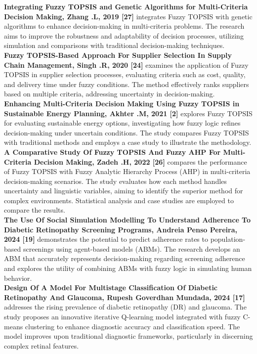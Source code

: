 \documentclass[12pt,a4paper]{article}
\begin{document}
\textbf{Integrating Fuzzy TOPSIS and Genetic Algorithms for Multi-Criteria Decision Making, Zhang .L, 2019 [27] }integrates Fuzzy TOPSIS with genetic algorithms to enhance decision-making in multi-criteria problems. The research aims to improve the robustness and adaptability of decision processes, utilizing simulation and comparisons with traditional decision-making techniques.\\
\newpage
\textbf{Fuzzy TOPSIS-Based Approach For Supplier Selection In Supply Chain Management, Singh .R, 2020 [24]} examines the application of Fuzzy TOPSIS in supplier selection processes, evaluating criteria such as cost, quality, and delivery time under fuzzy conditions. The method effectively ranks suppliers based on multiple criteria, addressing uncertainty in decision-making.\\

\textbf{Enhancing Multi-Criteria Decision Making Using Fuzzy TOPSIS in Sustainable Energy Planning, Akhter .M, 2021 [2]} explores Fuzzy TOPSIS for evaluating sustainable energy options, investigating how fuzzy logic refines decision-making under uncertain conditions. The study compares Fuzzy TOPSIS with traditional methods and employs a case study to illustrate the methodology.\\

\textbf{A Comparative Study Of Fuzzy TOPSIS And Fuzzy AHP For Multi-Criteria Decision Making, Zadeh .H, 2022 [26]} compares the performance of Fuzzy TOPSIS with Fuzzy Analytic Hierarchy Process (AHP) in multi-criteria decision-making scenarios. The study evaluates how each method handles uncertainty and linguistic variables, aiming to identify the superior method for complex environments. Statistical analysis and case studies are employed to compare the results.\\

\textbf{The Use Of Social Simulation Modelling To Understand Adherence To Diabetic Retinopathy Screening Programs, Andreia Penso Pereira, 2024 [19]} demonstrates the potential to predict adherence rates to population-based screenings using agent-based models (ABMs). The research develops an ABM that accurately represents decision-making regarding screening adherence and explores the utility of combining ABMs with fuzzy logic in simulating human behavior.\\

\textbf{Design Of A Model For Multistage Classification Of Diabetic Retinopathy And Glaucoma, Rupesh Goverdhan Mundada, 2024 [17]} addresses the rising prevalence of diabetic retinopathy (DR) and glaucoma. The study proposes an innovative iterative Q-learning model integrated with fuzzy C-means clustering to enhance diagnostic accuracy and classification speed. The model improves upon traditional diagnostic frameworks, particularly in discerning complex retinal features.\\
\end{document}
